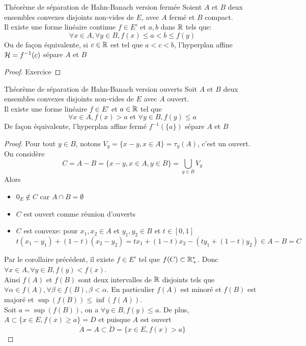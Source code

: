 \documentclass[]{report}
\begin{document}
    \begin{cor}{Théorème de séparation de Hahn-Banach version fermée}{}
        Soient $A$ et $B$ deux ensembles convexes disjoints non-vides de $E$, avec $A$ fermé et $B$ compact.\\
        Il existe une forme linéaire continue $f\in E'$ et $a,b$ dans $\mathbb{R}$ tels que:
        \[\forall x\in A,\forall y\in B,f(x)\le a<b\le f(y)\]
        Ou de façon équivalente, si $c\in \mathbb{R}$ est tel que $a<c<b$, l'hyperplan affine $\mathcal{H}=f^{-1}({c})$ sépare $A$ et $B$
    \end{cor}

    \begin{proof}
        Exercice
    \end{proof}

    \begin{cor}{Théorème de séparation de Hahn-Banach version ouverts}{}
        Soit $A$ et $B$ deux ensembles convexes disjoints non-vides de $E$ avec $A$ ouvert.\\
        Il existe une forme linéaire $f\in E'$ et $a\in \mathbb{R}$ tel que
        \[\forall x\in A,f(x)>a\text{ et }\forall y\in B, f(y)\le a\]
        De façon équivalente, l'hyperplan affine fermé $f^{-1}\left(\{a\}\right)$ sépare $A$ et $B$
    \end{cor}

    \begin{proof}
        Pour tout $y\in B$, notons $V_y=\{x-y,x\in A\}=\tau_y(A)$, c'est un ouvert.\\
        On considère
        \[C=A-B=\{x-y,x\in A,y\in B\}=\bigcup_{y\in B}V_y\]
        Alors
        \begin{itemize}
            \item $0_E\notin C$ car $A\cap B=\emptyset$
            \item $C$ est ouvert comme réunion d'ouverts
            \item $C$ est convexe: pour $x_1,x_2\in A$ et $y_1,y_2\in B$ et $t\in [0,1]$
            \[t(x_1-y_1)+(1-t)(x_2-y_2)=tx_1+(1-t)x_2 -(ty_1+(1-t)y_2)\in A-B=C\]
        \end{itemize}
        Par le corollaire précédent, il existe $f\in E'$ tel que $f(C)\subset \mathbb{R}_+^*$. Donc $\forall x\in A,\forall y\in B, f(y)<f(x)$.\\
        Ainsi $f(A)$ et $f(B)$ sont deux intervalles de $\mathbb{R}$ disjoints tels que $\forall \alpha \in f(A),\forall \beta \in f(B), \beta<\alpha$. En particulier $f(A)$ est minoré et $f(B)$ est majoré et $\sup(f(B))\le \inf (f(A))$.\\
        Soit $a=\sup(f(B))$, on a $\forall y\in B,f(y)\le a$. De plus, $A\subset \{x\in E,f(x)\ge a\}=D$ et puisque $A$ est ouvert
        \[\mathring{A}=A\subset \mathring{D}=\{x\in E,f(x)>a\}\] 
    \end{proof}
\end{document}
